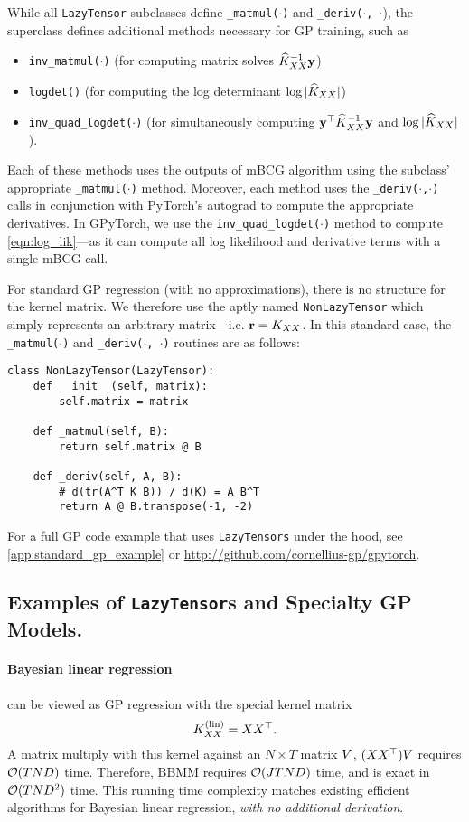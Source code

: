 While all {\tt LazyTensor} subclasses define {\tt \_matmul($\cdot$)} and {\tt \_deriv($\cdot$, $\cdot$}),
the superclass defines additional methods necessary for GP training, such as
%
\begin{itemize}
  \item {\tt inv\_matmul($\cdot$)} (for computing matrix solves $\widehat{K}_{XX}^{-1} \mathbf{y}$)
  \item {\tt logdet()} (for computing the log determinant $\log \vert \widehat{K}_{XX} \vert$)
  \item {\tt inv\_quad\_logdet($\cdot$)} (for simultaneously computing $\mathbf{y}^\top \widehat{K}_{XX}^{-1} \mathbf{y}$ and $\log \vert \widehat{K}_{XX} \vert$).
\end{itemize}
%
Each of these methods uses the outputs of mBCG algorithm using the subclass' appropriate {\tt \_matmul($\cdot$)} method.
Moreover, each method uses the {\tt \_deriv($\cdot$,$\cdot$)} calls in conjunction with PyTorch's autograd \cite{paszke2017automatic} to compute the appropriate derivatives.
In GPyTorch, we use the {\tt inv\_quad\_logdet($\cdot$)} method to compute \cref{eqn:log_lik}---as it can compute all log likelihood and derivative terms with a single mBCG call.

For standard GP regression (with no approximations), there is no structure for the kernel matrix.
We therefore use the aptly named {\tt NonLazyTensor} which simply represents an arbitrary matrix---i.e. $\mathbf{r} = K_{XX}$.
In this standard case, the {\tt \_matmul($\cdot$)} and {\tt \_deriv($\cdot$, $\cdot$)} routines are as follows:
%
\begin{verbatim}
class NonLazyTensor(LazyTensor):
    def __init__(self, matrix):
        self.matrix = matrix

    def _matmul(self, B):
        return self.matrix @ B

    def _deriv(self, A, B):
        # d(tr(A^T K B)) / d(K) = A B^T
        return A @ B.transpose(-1, -2)
\end{verbatim}
%
\noindent
For a full GP code example that uses {\tt LazyTensors} under the hood, see \cref{app:standard_gp_example} or \url{http://github.com/cornellius-gp/gpytorch}.


\subsection{Examples of {\tt LazyTensor}s and Specialty GP Models.}
\paragraph{Bayesian linear regression} can be viewed as GP regression with the special kernel matrix
\[
  K_{XX}^{(\text{lin})} = XX^{\top}.
\]
A matrix multiply with this kernel against an $N \times T$ matrix $V$, $(XX^{\top})V$ requires $\bigo{TND}$ time.
Therefore, BBMM requires $\bigo{JTND}$ time, and is exact in $\bigo{TND^2}$ time.
This running time complexity matches existing efficient algorithms for Bayesian linear regression, \emph{with no additional derivation}.

